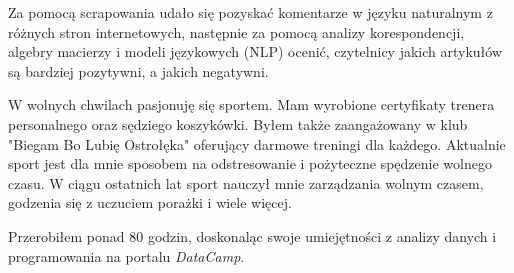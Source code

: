 \documentclass[10pt,a4paper,ragged2e,withhyper]{altacv}
\begin{document}
\begin{paracol}{2}
		
		Za pomocą scrapowania udało się pozyskać komentarze w języku naturalnym z różnych stron internetowych, następnie za pomocą analizy korespondencji, algebry macierzy i modeli językowych (NLP) ocenić, czytelnicy jakich artykułów są bardziej pozytywni, a jakich negatywni.
		
		\small W wolnych chwilach pasjonuję się sportem. Mam wyrobione certyfikaty trenera personalnego oraz sędziego koszykówki. Byłem także zaangażowany w klub "Biegam Bo Lubię Ostrołęka" oferujący darmowe treningi dla każdego. Aktualnie sport jest dla mnie sposobem na odstresowanie i pożyteczne spędzenie wolnego czasu. W ciągu ostatnich lat sport nauczył mnie zarządzania wolnym czasem, godzenia się z uczuciem porażki i wiele więcej. 

		\small Przerobiłem ponad 80 godzin, doskonaląc swoje umiejętności z analizy danych i programowania na portalu \textit{DataCamp}.
	\end{paracol}
	
\end{document}
